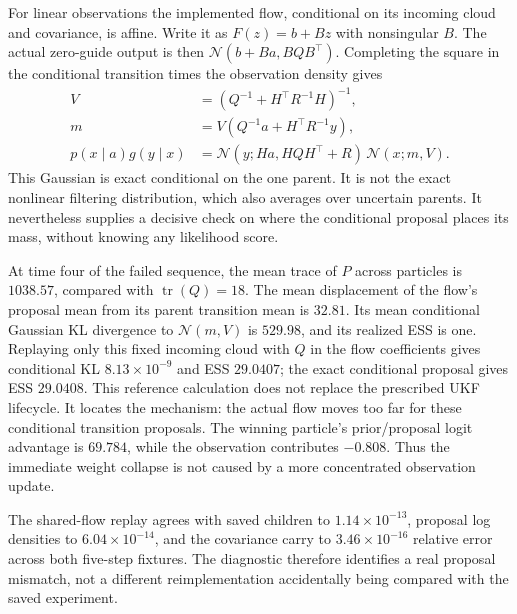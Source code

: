 For linear observations the implemented flow, conditional on its incoming
cloud and covariance, is affine. Write it as $F(z)=b+Bz$ with nonsingular
$B$. The actual zero-guide output is then
$\mathcal N(b+Ba,BQB^\top)$. Completing the square in the conditional
transition times the observation density gives
\begin{align}
 V&=(Q^{-1}+H^\top R^{-1}H)^{-1},\\
 m&=V(Q^{-1}a+H^\top R^{-1}y),\\
 p(x\mid a)g(y\mid x)&=\mathcal N(y;Ha,HQH^\top+R)\,\mathcal N(x;m,V).
\end{align}
This Gaussian is exact conditional on the one parent. It is not the exact
nonlinear filtering distribution, which also averages over uncertain parents.
It nevertheless supplies a decisive check on where the conditional proposal
places its mass, without knowing any likelihood score.

At time four of the failed sequence, the mean trace of $P$ across particles
is $1038.57$, compared with $\operatorname{tr}(Q)=18$. The mean displacement
of the flow's proposal mean from its parent transition mean is $32.81$. Its
mean conditional Gaussian KL divergence to $\mathcal N(m,V)$ is $529.98$,
and its realized ESS is one. Replaying only this fixed incoming cloud with
$Q$ in the flow coefficients gives conditional KL $8.13\times10^{-9}$ and
ESS $29.0407$; the exact conditional proposal gives ESS $29.0408$. This
reference calculation does not replace the prescribed UKF lifecycle. It
locates the mechanism: the actual flow moves too far for these conditional
transition proposals. The winning particle's prior/proposal logit advantage
is $69.784$, while the observation contributes $-0.808$. Thus the immediate
weight collapse is not caused by a more concentrated observation update.

The shared-flow replay agrees with saved children to $1.14\times10^{-13}$,
proposal log densities to $6.04\times10^{-14}$, and the covariance carry to
$3.46\times10^{-16}$ relative error across both five-step fixtures. The
diagnostic therefore identifies a real proposal mismatch, not a different
reimplementation accidentally being compared with the saved experiment.

